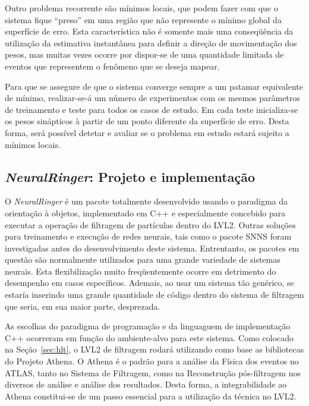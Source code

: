 Outro problema recorrente são mínimos locais, que podem fazer com que o
sistema fique ``preso'' em uma região que não represente o mínimo global da
superfície de erro. Esta característica não é somente mais uma conseqüência da
utilização da estimativa instantânea para definir a direção de movimentação
dos pesos, mas muitas vezes ocorre por dispor-se de uma quantidade limitada de
eventos que representem o fenômeno que se deseja mapear.

Para que se assegure de que o sistema converge sempre a um patamar equivalente
de mínimo, realizar-se-á um número de experimentos com os mesmos parâmetros de
treinamento e teste para todos os casos de estudo. Em cada teste inicializa-se
os pesos sinápticos à partir de um ponto diferente da superfície de
erro. Desta forma, será possível detetar e avaliar se o problema em estudo
estará sujeito a mínimos locais.

\subsection{\textit{NeuralRinger}: Projeto e implementação}
\label{sec:framework}

O \textit{NeuralRinger} é um pacote totalmente desenvolvido usando o paradigma
da orientação à objetos, implementado em C++ \cite{stroustrup} e especialmente
concebido para executar a operação de filtragem de partículas dentro do
LVL2. Outras soluções para treinamento e execução de redes neurais, tais como
o pacote SNNS \cite{snns} foram investigadas antes do desenvolvimento deste
sistema. Entrentanto, os pacotes em questão são normalmente utilizados para
uma grande variedade de sistemas neurais. Esta flexibilização muito
freqüentemente ocorre em detrimento do desempenho em casos
específicos. Ademais, ao usar um sistema tão genérico, se estaría inserindo
uma grande quantidade de código dentro do sistema de filtragem que seria, em
sua maior parte, desprezada.

As escolhas do paradigma de programação e da linguaguem de implementação C++
ocorreram em função do ambiente-alvo para este sistema. Como colocado na
Seção~\ref{sec:hlt}, o LVL2 de filtragem rodará utilizando como base as
bibliotecas do Projeto Athena. O Athena é o  padrão para a
análise da Física dos eventos no ATLAS, tanto no Sistema de Filtragem, como na
Reconstrução pós-filtragem nos diversos  de análise
 e análise dos resultados. Desta forma, a integrabilidade ao Athena
constitui-se de um passo essencial para a utilização da técnica no LVL2.

